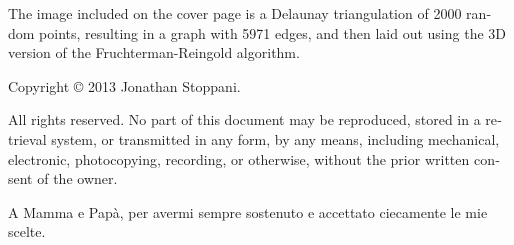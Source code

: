 \begin{otherlanguage}{english}
%

\vfill

The image included on the cover page is a Delaunay triangulation of 2000 random points, resulting in a graph with 5971 edges, and then laid out using the 3D version of the Fruchterman-Reingold algorithm.

\vfill

Copyright © 2013 Jonathan Stoppani.

All rights reserved. No part of this document may be reproduced, stored in a retrieval system, or transmitted in any form, by any means, including mechanical, electronic, photocopying, recording, or otherwise, without the prior written consent of the owner.

\restoregeometry
\end{otherlanguage} 

\cleartoodd
\thispagestyle{empty}


\vspace*{7cm}

A Mamma e Papà, per avermi sempre sostenuto e accettato ciecamente le mie scelte.

\restoregeometry

